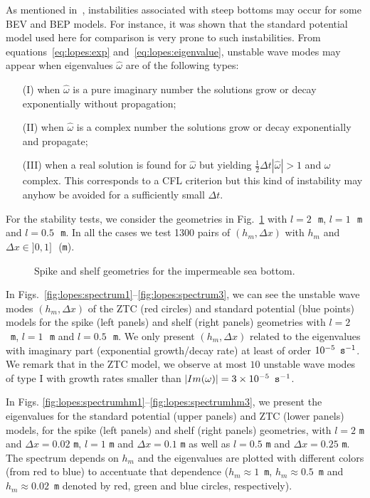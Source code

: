 As mentioned in~\cite{LovholtPedersen2009}, instabilities
 associated with steep bottoms may occur for some BEV and
 BEP models.  For instance, it was shown that the standard
 potential model used here for comparison is very prone to
 such instabilities.
From equations~\eqref{eq:lopes:exp}
and~\eqref{eq:lopes:eigenvalue},  unstable wave modes  may appear when
eigenvalues $\hat\omega$ are of the following types:
\begin{itemize}
\item[(I)] when $\hat\omega$ is a pure imaginary number the
solutions grow or decay exponentially without propagation;
\item[(II)] when $\hat\omega$ is a complex number the solutions grow
or decay exponentially and propagate;
\item[(III)] when a real solution is found for
$\hat\omega$ but  yielding $\frac{1}{2}\Delta t
|\hat\omega|>1$ and $\omega$ complex.
This corresponds to a CFL criterion but this kind
of instability may anyhow be avoided for a sufficiently
small $\Delta t$.
\end{itemize}

For the  stability tests, we consider the geometries
in Fig.~\ref{fig:lopes:spikeshelf}
with  $l=2$\,~{\tt m}, $l=1$\,~{\tt m} and $l=0.5$\,~{\tt m}.
In all the cases we test  1300 pairs of
$(h_m,\Delta x)$ with $ h_m$ and $\Delta x\in ]0,1]$\,~({\tt m}).
\begin{figure}
{\small
\begin{center}
\end{center}
}
\caption{Spike and shelf geometries for the impermeable sea bottom.}
\label{fig:lopes:spikeshelf}
\end{figure}

In
Figs.~\ref{fig:lopes:spectrum1}--\ref{fig:lopes:spectrum3},
we can see the unstable wave modes $(h_m,\Delta x)$ of the ZTC
(red circles) and standard potential (blue points) models
for the spike (left panels) and shelf (right panels)
geometries with $l=2$\,~{\tt m}, $l=1$\,~{\tt m} and
$l=0.5$\,~{\tt m}.  We only present $(h_m,\Delta x)$ related
to the eigenvalues with imaginary part (exponential
growth/decay rate) at least of order $10^{-5}\,~{\tt
s}^{-1}$.  We remark that in the ZTC model, we
observe at most $10$ unstable wave modes of type I
with growth rates smaller than $|Im(\omega)|=3\times
10^{-5}\,~{\tt s}^{-1}$.



In Figs. \ref{fig:lopes:spectrumhm1}--\ref{fig:lopes:spectrumhm3},
we present the eigenvalues for the standard potential
 (upper panels) and ZTC (lower panels)
 models, for the spike (left panels) and
 shelf (right panels) geometries, with  $l=2$ {\tt m} and
 $\Delta x=0.02$ {\tt m}, $l=1$ {\tt m} and
 $\Delta x=0.1$ {\tt m} as well as
$l=0.5$ {\tt m} and
 $\Delta x=0.25$ {\tt m}.
The  spectrum   depends  on $h_m$ and the eigenvalues are
plotted with different colors (from red to blue) to accentuate that
dependence ($h_m\approx 1$~{\tt m},
$h_m\approx 0.5$~{\tt m}
 and $h_m\approx 0.02$~{\tt m} denoted by red, green and
 blue circles, respectively).

